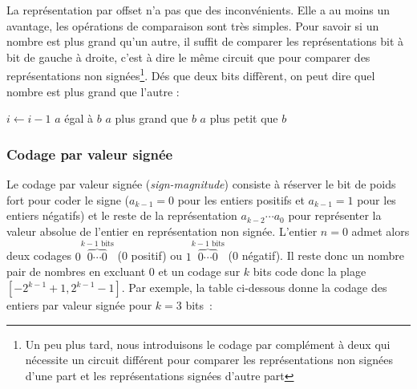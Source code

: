 La représentation par offset n'a pas que des inconvénients. Elle a au moins un avantage, les opérations de comparaison sont très simples. Pour savoir si un nombre est plus grand qu'un autre, il suffit de comparer les représentations bit à bit de gauche à droite, c'est à dire le même circuit que pour comparer des représentations non signées\footnote{Un peu plus tard, nous introduisons le codage par complément à deux qui nécessite un circuit différent pour comparer les représentations non signées d'une part et les représentations signées d'autre part}. Dés que deux bits diffèrent, on peut dire quel nombre est plus grand que l'autre :

\begin{algorithm}
\caption{ \label{algo:comparaison_offset}}
\begin{algorithmic}[1]

\State $i \gets i - 1$
\EndWhile
{}
\State \Return $a$ égal à $b$
\State \Return $a$ plus grand que $b$
\Else
\State \Return $a$ plus petit que $b$
\EndIf
\EndFunction
\end{algorithmic}
\end{algorithm}



\subsubsection{Codage par valeur signée}

Le codage par valeur signée (\emph{sign-magnitude}) consiste à réserver le bit de poids fort pour coder le signe ($a_{k-1} = 0$ pour les entiers positifs et $a_{k-1}=1$ pour les entiers négatifs) et le reste de la représentation $a_{k-2}\cdots a_0$ pour représenter la valeur absolue de l'entier en représentation non signée. L'entier $n=0$ admet alors deux codages $0\overbrace{0\cdots 0}^{k-1\mbox{ bits}}$ (0 positif) ou $1\overbrace{0\cdots 0}^{k-1\mbox{ bits}}$ (0 négatif). Il reste donc un nombre pair de nombres en excluant 0 et un codage sur $k$ bits code donc la plage $[-2^{k-1}+1, 2^{k-1}-1]$. Par exemple, la table ci-dessous donne la codage des entiers par valeur signée pour $k=3$ bits~:

